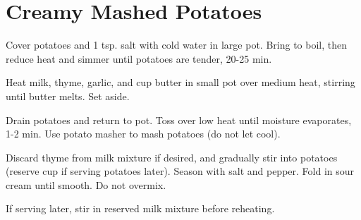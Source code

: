 \section{Creamy Mashed Potatoes}
\begin{recipe}



	Cover potatoes and 1 tsp. salt with cold water in large pot. Bring to boil, then reduce heat and simmer until potatoes are tender, 20-25 min.

	Heat milk, thyme, garlic, and  cup butter in small pot over medium heat, stirring until butter melts. Set aside.

	Drain potatoes and return to pot. Toss over low heat until moisture evaporates, 1-2 min. Use potato masher to mash potatoes (do not let cool).

	Discard thyme from milk mixture if desired, and gradually stir into potatoes (reserve  cup if serving potatoes later). Season with salt and pepper. Fold in sour cream until smooth. Do not overmix.

	If serving later, stir in reserved milk mixture before reheating.
\end{recipe}
